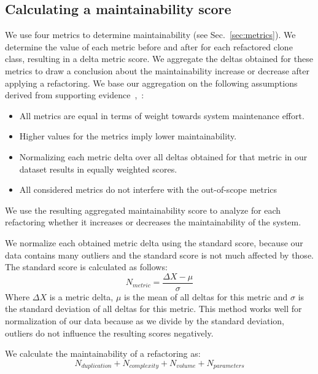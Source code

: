 \documentclass[sigconf,review,anonymous]{acmart}
\begin{document}
\subsection{Calculating a maintainability score}\label{sec:metricformula}
We use four metrics to determine maintainability (see Sec.~\ref{sec:metrics}). We determine the value of each metric before and after for each refactored clone class, resulting in a delta metric score. We aggregate the deltas obtained for these metrics to draw a conclusion about the maintainability increase or decrease after applying a refactoring. We base our aggregation on the following assumptions derived from supporting evidence~\cite{heitlager2007practical},~\cite{alves2010deriving}:
\begin{itemize}
  \item All metrics are equal in terms of weight towards system maintenance effort.
  \item Higher values for the metrics imply lower maintainability.
  \item Normalizing each metric delta over all deltas obtained for that metric in our dataset results in equally weighted
  scores.%
  \item All considered metrics do not interfere with the out-of-scope metrics
\end{itemize}

We use the resulting aggregated maintainability score to analyze  for each refactoring whether it increases or decreases the maintainability of the system.

We normalize each obtained metric delta using the standard score, because our data contains many outliers and the standard score is not much affected by those. The standard score is calculated as follows:
\begin{equation}\label{eq:scoredev}
N_{metric} = \frac {\Delta X-\mu}{\sigma}
\end{equation}
Where $\Delta X$ is a metric delta, $\mu$ is the mean of all deltas for this metric and $\sigma$ is the standard deviation of all deltas for this metric. This method works well for normalization of our data because as we divide by the standard deviation, outliers do not influence the resulting scores negatively.%

We calculate the maintainability of a refactoring as:
\begin{equation}\label{eq:scoreref}
N_{duplication} + N_{complexity} + N_{volume} + N_{parameters}
\end{equation}
\end{document}
